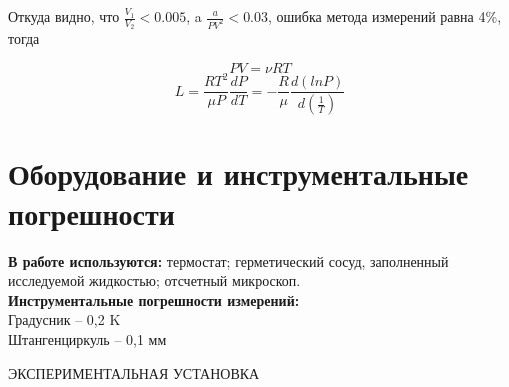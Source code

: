  Откуда видно, что $\frac{V_1}{V_2} < 0.005$, a $\frac{a}{PV^2}<0.03$, ошибка метода измерений равна 4\%, тогда
 
 \begin{equation*}
PV=\nu RT
\end{equation*}
\begin{equation*}
L=\frac{ RT^2}{\mu P}\frac{dP}{dT} = - \frac{R}{\mu} \frac{d(lnP)}{d(\frac{1}{T})}
\end{equation*}

\section{Оборудование и инструментальные погрешности}

\textbf{В работе используются:} термостат; герметический сосуд, заполненный исследуемой жидкостью; отсчетный микроскоп.\\
\textbf{Инструментальные погрешности измерений:}\\
Градусник -- 0,2 K \\
Штангенциркуль -- 0,1 мм\\


\begin{center}
ЭКСПЕРИМЕНТАЛЬНАЯ УСТАНОВКА
\end{center}


